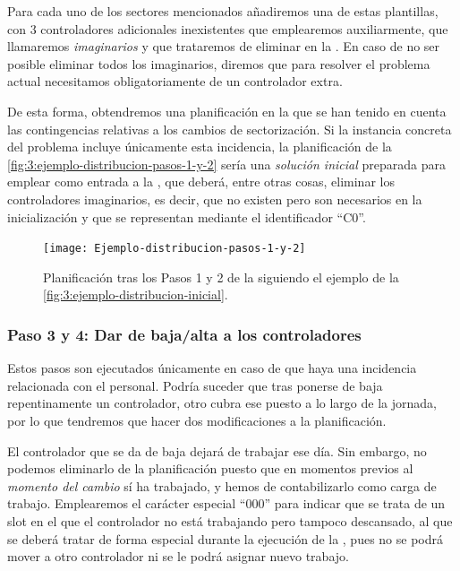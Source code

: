 Para cada uno de los sectores mencionados añadiremos una de estas plantillas, con 3 controladores adicionales inexistentes que emplearemos auxiliarmente, que llamaremos \textit{imaginarios} y que trataremos de eliminar en la \fasedos{}. En caso de no ser posible eliminar todos los imaginarios, diremos que para resolver el problema actual necesitamos obligatoriamente de un controlador extra.

De esta forma, obtendremos una planificación en la que se han tenido en cuenta las contingencias relativas a los cambios de sectorización. Si la instancia concreta del problema incluye únicamente esta incidencia, la planificación de la \autoref{fig:3:ejemplo-distribucion-pasos-1-y-2} sería una \textit{solución inicial} preparada para emplear como entrada a la \fasedos{}, que deberá, entre otras cosas, eliminar los controladores imaginarios, es decir, que no existen pero son necesarios en la inicialización y que se representan mediante el identificador ``C0''.

\begin{figure}
	\centering
	\texttt{[image: Ejemplo-distribucion-pasos-1-y-2]}
	\caption[Planificación tras los Pasos 1 y 2 de la Fase 1]{Planificación tras los Pasos 1 y 2 de la \faseuno{} siguiendo el ejemplo de la \autoref{fig:3:ejemplo-distribucion-inicial}.}
	\label{fig:3:ejemplo-distribucion-pasos-1-y-2}
\end{figure}

\subsubsection{Paso 3 y 4: Dar de baja/alta a los controladores}
\label{sec:baja-alta-controladores}

Estos pasos son ejecutados únicamente en caso de que haya una incidencia relacionada con el personal. Podría suceder que tras ponerse de baja repentinamente un controlador, otro cubra ese puesto a lo largo de la jornada, por lo que tendremos que hacer dos modificaciones a la planificación.

El controlador que se da de baja dejará de trabajar ese día. Sin embargo, no podemos eliminarlo de la planificación puesto que en momentos previos al \textit{momento del cambio} sí ha trabajado, y hemos de contabilizarlo como carga de trabajo. Emplearemos el carácter especial ``000'' para indicar que se trata de un slot en el que el controlador no está trabajando pero tampoco descansado, al que se deberá tratar de forma especial durante la ejecución de la \fasedos{}, pues no se podrá mover a otro controlador ni se le podrá asignar nuevo trabajo. 

